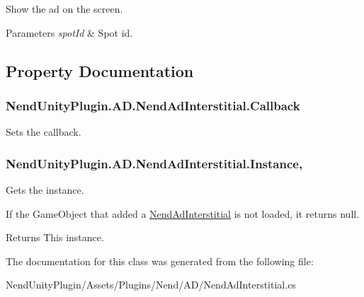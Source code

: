 Show the ad on the screen. 


\begin{DoxyParams}{Parameters}
{\em spot\+Id} & Spot id.\\
\hline
\end{DoxyParams}


\subsection{Property Documentation}
\hypertarget{class_nend_unity_plugin_1_1_a_d_1_1_nend_ad_interstitial_ac55674bb9ffdbe98e3639c12250776fd}{}
\subsubsection[{Callback}]{ Nend\+Unity\+Plugin.\+A\+D.\+Nend\+Ad\+Interstitial.\+Callback\hspace{0.3cm}{\ttfamily [set]}}\label{class_nend_unity_plugin_1_1_a_d_1_1_nend_ad_interstitial_ac55674bb9ffdbe98e3639c12250776fd}


Sets the callback. 

\hypertarget{class_nend_unity_plugin_1_1_a_d_1_1_nend_ad_interstitial_ad3a8b188cb691acbaaa29f65433dcef1}{}
\subsubsection[{Instance}]{ Nend\+Unity\+Plugin.\+A\+D.\+Nend\+Ad\+Interstitial.\+Instance\hspace{0.3cm}{\ttfamily [static]}, {\ttfamily [get]}}\label{class_nend_unity_plugin_1_1_a_d_1_1_nend_ad_interstitial_ad3a8b188cb691acbaaa29f65433dcef1}


Gets the instance. 

If the Game\+Object that added a \hyperlink{class_nend_unity_plugin_1_1_a_d_1_1_nend_ad_interstitial}{Nend\+Ad\+Interstitial} is not loaded, it returns null.

\begin{DoxyReturn}{Returns}
This instance.
\end{DoxyReturn}


The documentation for this class was generated from the following file\+:\begin{DoxyCompactItemize}
\item 
Nend\+Unity\+Plugin/\+Assets/\+Plugins/\+Nend/\+A\+D/Nend\+Ad\+Interstitial.\+cs\end{DoxyCompactItemize}
